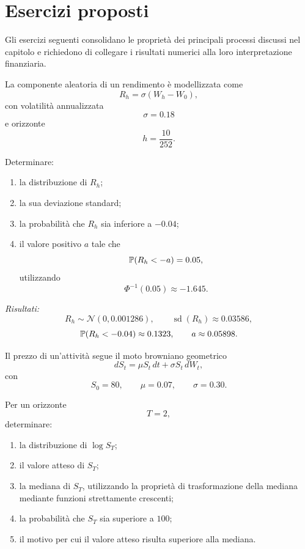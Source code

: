 \section{Esercizi proposti}
\label{sec:cap06-esercizi-proposti}

Gli esercizi seguenti consolidano le propriet\`{a} dei principali
processi discussi nel capitolo e richiedono di collegare i risultati
numerici alla loro interpretazione finanziaria.

\begin{exercise}
\label{ex:cap06-proposto-shock-dieci-giorni}

La componente aleatoria di un rendimento \`{e} modellizzata come
\[
R_h=\sigma(W_h-W_0),
\]
con volatilit\`{a} annualizzata
\[
\sigma=0.18
\]
e orizzonte
\[
h=\frac{10}{252}.
\]

Determinare:

\begin{enumerate}
\item la distribuzione di $R_h$;
\item la sua deviazione standard;
\item la probabilit\`{a} che $R_h$ sia inferiore a $-0.04$;
\item il valore positivo $a$ tale che
\[
\mathbb{P}(R_h<-a)=0.05,
\]
utilizzando
\[
\Phi^{-1}(0.05)\approx -1.645.
\]
\end{enumerate}

\end{exercise}

\noindent
\textit{Risultati:}
\[
R_h\sim\mathcal{N}(0,0.001286),
\qquad
\operatorname{sd}(R_h)\approx0.03586,
\]
\[
\mathbb{P}(R_h<-0.04)\approx0.1323,
\qquad
a\approx0.05898.
\]


\begin{exercise}
\label{ex:cap06-proposto-gbm-terminale}

Il prezzo di un'attivit\`{a} segue il moto browniano geometrico
\[
dS_t=\mu S_t\,dt+\sigma S_t\,dW_t,
\]
con
\[
S_0=80,
\qquad
\mu=0.07,
\qquad
\sigma=0.30.
\]

Per un orizzonte
\[
T=2,
\]
determinare:

\begin{enumerate}
\item la distribuzione di $\log S_T$;
\item il valore atteso di $S_T$;
\item la mediana di $S_T$, utilizzando la propriet\`{a} di
trasformazione della mediana mediante funzioni strettamente crescenti;
\item la probabilit\`{a} che $S_T$ sia superiore a $100$;
\item il motivo per cui il valore atteso risulta superiore alla
mediana.
\end{enumerate}

\end{exercise}

